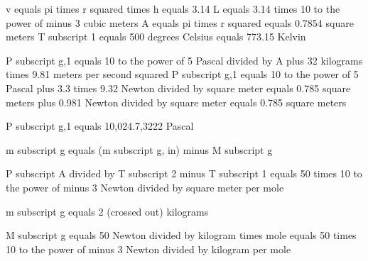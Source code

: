 v equals pi times r squared times h equals 3.14 L equals 3.14 times 10 to the power of minus 3 cubic meters  
A equals pi times r squared equals 0.7854 square meters  
T subscript 1 equals 500 degrees Celsius equals 773.15 Kelvin

P subscript g,1 equals 10 to the power of 5 Pascal divided by A plus 32 kilograms times 9.81 meters per second squared  
P subscript g,1 equals 10 to the power of 5 Pascal plus 3.3 times 9.32 Newton divided by square meter equals 0.785 square meters plus 0.981 Newton divided by square meter equals 0.785 square meters  

P subscript g,1 equals 10,024.7,3222 Pascal

m subscript g equals (m subscript g, in) minus M subscript g  

P subscript A divided by T subscript 2 minus T subscript 1 equals 50 times 10 to the power of minus 3 Newton divided by square meter per mole

m subscript g equals 2 (crossed out) kilograms  

M subscript g equals 50 Newton divided by kilogram times mole equals 50 times 10 to the power of minus 3 Newton divided by kilogram per mole